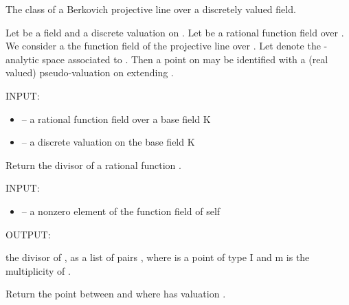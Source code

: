 \documentclass[letterpaper,10pt,english]{sphinxmanual}
\begin{document}
\begin{fulllineitems}
\label{berkovich_line:mclf.berkovich.berkovich_line.BerkovichLine}
The class of a Berkovich projective line over a discretely valued field.

Let  be a field and  a discrete valuation on . Let 
be a rational function field over . We consider  a the function
field of the projective line  over . Let  denote the
-analytic space associated to . Then a point  on 
may be identified with a (real valued) pseudo-valuation  on 
extending .

INPUT:
\begin{itemize}
\item {} 
 -- a rational function field over a base field K

\item {} 
 -- a discrete valuation on the base field K

\end{itemize}

\begin{fulllineitems}
\label{berkovich_line:mclf.berkovich.berkovich_line.BerkovichLine.divisor}
Return the divisor of a rational function .

INPUT:
\begin{itemize}
\item {} 
 -- a nonzero element of the function field of self

\end{itemize}

OUTPUT:

the divisor of , as a list of pairs , where  is
a point of type I and m is the multiplicity of .

\end{fulllineitems}


\begin{fulllineitems}
\label{berkovich_line:mclf.berkovich.berkovich_line.BerkovichLine.find_zero}
Return the point between  and  where  has valuation .


\end{fulllineitems}
\end{fulllineitems}
\end{document}

